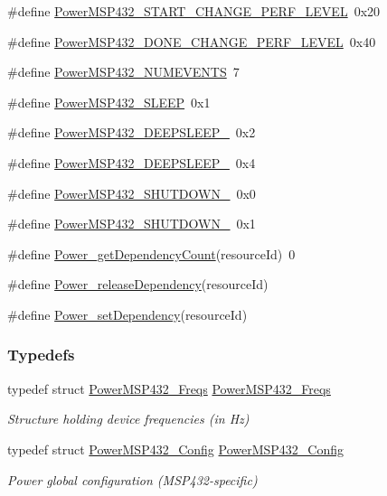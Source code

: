 \begin{DoxyCompactItemize}
\item 
\#define \hyperlink{_power_m_s_p432_8h_aa432806f6f74bb50c748b506b19d375c}{Power\+M\+S\+P432\+\_\+\+S\+T\+A\+R\+T\+\_\+\+C\+H\+A\+N\+G\+E\+\_\+\+P\+E\+R\+F\+\_\+\+L\+E\+V\+E\+L}~0x20
\item 
\#define \hyperlink{_power_m_s_p432_8h_a18c7d556af9e059351dcfb0f4062fdf1}{Power\+M\+S\+P432\+\_\+\+D\+O\+N\+E\+\_\+\+C\+H\+A\+N\+G\+E\+\_\+\+P\+E\+R\+F\+\_\+\+L\+E\+V\+E\+L}~0x40
\item 
\#define \hyperlink{_power_m_s_p432_8h_a448fcbe1ab8453fbbf1b1be985e12443}{Power\+M\+S\+P432\+\_\+\+N\+U\+M\+E\+V\+E\+N\+T\+S}~7
\item 
\#define \hyperlink{_power_m_s_p432_8h_a38869b916409b3d150be8ab85114bba8}{Power\+M\+S\+P432\+\_\+\+S\+L\+E\+E\+P}~0x1
\item 
\#define \hyperlink{_power_m_s_p432_8h_a2a4fd7bba646587655e8de0fdfda82d9}{Power\+M\+S\+P432\+\_\+\+D\+E\+E\+P\+S\+L\+E\+E\+P\+\_}~0x2
\item 
\#define \hyperlink{_power_m_s_p432_8h_a13c3fb19e15734f5da0cb39c1f11c59c}{Power\+M\+S\+P432\+\_\+\+D\+E\+E\+P\+S\+L\+E\+E\+P\+\_}~0x4
\item 
\#define \hyperlink{_power_m_s_p432_8h_a676b017b14758f39e788b3aa07cd1dfe}{Power\+M\+S\+P432\+\_\+\+S\+H\+U\+T\+D\+O\+W\+N\+\_}~0x0
\item 
\#define \hyperlink{_power_m_s_p432_8h_a845c92d66fb0ec1bc650add796e8ae91}{Power\+M\+S\+P432\+\_\+\+S\+H\+U\+T\+D\+O\+W\+N\+\_}~0x1
\item 
\#define \hyperlink{_power_m_s_p432_8h_a82c91c911470c7c70eb21773f9a78661}{Power\+\_\+get\+Dependency\+Count}(resource\+Id)~0
\item 
\#define \hyperlink{_power_m_s_p432_8h_a7260b02519c65c9f47a9d4ee198122be}{Power\+\_\+release\+Dependency}(resource\+Id)
\item 
\#define \hyperlink{_power_m_s_p432_8h_a0f1ef3efe94c238d089cc52cfd83894c}{Power\+\_\+set\+Dependency}(resource\+Id)
\end{DoxyCompactItemize}
\subsubsection*{Typedefs}
\begin{DoxyCompactItemize}
\item 
typedef struct \hyperlink{struct_power_m_s_p432___freqs}{Power\+M\+S\+P432\+\_\+\+Freqs} \hyperlink{_power_m_s_p432_8h_abe39fc5c741e4aa48057c69eba33c7f4}{Power\+M\+S\+P432\+\_\+\+Freqs}
\begin{DoxyCompactList}\small\item\em Structure holding device frequencies (in Hz) \end{DoxyCompactList}\item 
typedef struct \hyperlink{struct_power_m_s_p432___config}{Power\+M\+S\+P432\+\_\+\+Config} \hyperlink{_power_m_s_p432_8h_aa0d31607d39481c0ce6623d4cc682ab2}{Power\+M\+S\+P432\+\_\+\+Config}
\begin{DoxyCompactList}\small\item\em Power global configuration (M\+S\+P432-\/specific) \end{DoxyCompactList}\end{DoxyCompactItemize}
